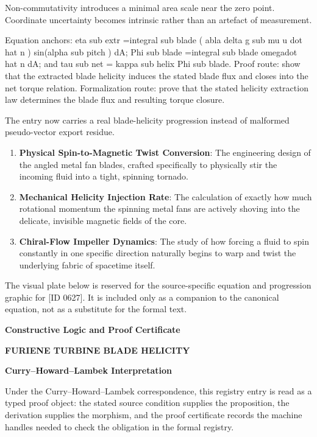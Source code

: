 Non-commutativity introduces a minimal area scale near the zero point. Coordinate uncertainty becomes intrinsic rather than an artefact of measurement.

Equation anchors: eta sub extr =integral sub blade ( abla delta g sub mu u dot hat n ) sin(alpha sub pitch ) dA; Phi sub blade =integral sub blade omegadot hat n dA; and tau sub net = kappa sub helix Phi sub blade. Proof route: show that the extracted blade helicity induces the stated blade flux and closes into the net torque relation. Formalization route: prove that the stated helicity extraction law determines the blade flux and resulting torque closure.

The entry now carries a real blade-helicity progression instead of malformed pseudo-vector export residue.
\endgroup

\begin{enumerate}[leftmargin=1.6em,itemsep=6pt,topsep=4pt]
\item \textbf{Physical Spin-to-Magnetic Twist Conversion}: The engineering design of the angled metal fan blades, crafted specifically to physically stir the incoming fluid into a tight, spinning tornado.
\item \textbf{Mechanical Helicity Injection Rate}: The calculation of exactly how much rotational momentum the spinning metal fans are actively shoving into the delicate, invisible magnetic fields of the core.
\item \textbf{Chiral-Flow Impeller Dynamics}: The study of how forcing a fluid to spin constantly in one specific direction naturally begins to warp and twist the underlying fabric of spacetime itself.
\end{enumerate}

\begingroup\footnotesize\sloppy
The visual plate below is reserved for the source-specific equation and progression graphic for [ID 0627]. It is included only as a companion to the canonical equation, not as a substitute for the formal text.
\par\endgroup
\ifTZPDarkEdition
{}
\fi

\clearpage
\begingroup\tzpsupportsetup
\noindent\textbf{\fontsize{10.8pt}{12.8pt}\selectfont [ID 0627] Constructive Logic and Proof Certificate}\par
\noindent\textbf{\fontsize{10pt}{12pt}\selectfont FURIENE TURBINE BLADE HELICITY}\par
\vspace{0.45em}
\begingroup
\footnotesize
\setlength{\parskip}{0.22em}
\setlength{\parindent}{0pt}
\noindent\textbf{Curry--Howard--Lambek Interpretation}\par
Under the Curry--Howard--Lambek correspondence, this registry entry is read as a typed proof
object: the stated source condition supplies the proposition, the derivation supplies the
morphism, and the proof certificate records the machine handles needed to check the obligation
in the formal registry.


